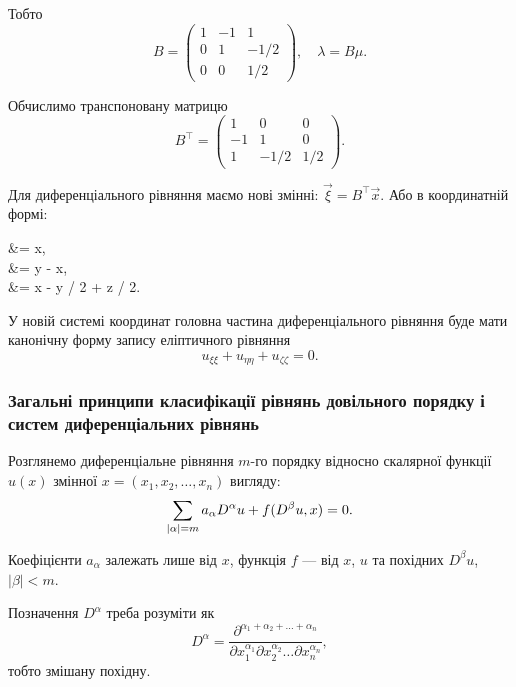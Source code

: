 \begin{solution}
	Тобто
	\begin{equation*}
		B = \begin{pmatrix} 
			1 & -1 & 1 \\
			0 & 1 & -1/2 \\
			0 & 0 & 1/2
		\end{pmatrix}, \quad \lambda = B \mu.
	\end{equation*}

	Обчислимо транспоновану матрицю
	\begin{equation*}
		B^\intercal = \begin{pmatrix} 
			1 & 0 & 0 \\
			-1 & 1 & 0 \\
			1 & -1/2 & 1/2
		\end{pmatrix}.
	\end{equation*}

	Для диференціального рівняння маємо нові змінні: $\vec \xi = B^\intercal \vec x$. Або в координатній формі:
	\begin{system*}
		\xi &= x, \\
		\eta &= y - x, \\
		\zeta &= x - y / 2 + z / 2.
	\end{system*}

	У новій системі координат головна частина диференціального рівняння буде мати канонічну форму запису еліптичного рівняння
	\begin{equation*}
		u_{\xi\xi} + u_{\eta\eta} + u_{\zeta\zeta} = 0.
	\end{equation*}
\end{solution}

\newpage

\subsubsection{Загальні принципи класифікації рівнянь довільного порядку і систем диференціальних рівнянь}

Розглянемо диференціальне рівняння $m$-го порядку відносно скалярної функції $u(x)$ змінної $x = (x_1, x_2, \ldots, x_n)$ вигляду:
\begin{equation}
	\displaystyle\sum\limits_{|\alpha|=m}a_\alpha D^\alpha u + f(D^\beta u, x) = 0.
\end{equation}

Коефіцієнти $a_\alpha$ залежать лише від $x$, функція $f$ --- від $x$, $u$ та похідних $D^\beta u$, $|\beta| < m$. 

\begin{remark}
	Позначення $D^\alpha$ треба розуміти як
	\begin{equation}
		D^\alpha = \frac{\partial^{\alpha_1+\alpha_2+\ldots+\alpha_n}}{\partial x_1^{\alpha_1}\partial x_2^{\alpha_2}\ldots\partial x_n^{\alpha_n}},
	\end{equation}
	тобто змішану похідну. 
\end{remark}

